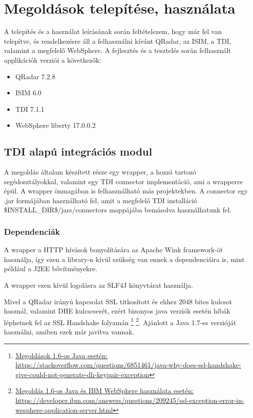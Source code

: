 \chapter{Megoldások telepítése, használata} \label{ch:usage}
A telepítés és a használat leírásának során feltételezem, hogy már fel van telepítve, és rendelkezésre áll a felhasználni kívánt QRadar, az ISIM, a TDI, valamint a megfelelő WebSphere. A fejlesztés és a tesztelés során felhasznált applikációk verziói a következők:

\begin{itemize}
	\item QRadar 7.2.8
	\item ISIM 6.0
	\item TDI 7.1.1
	\item WebSphere liberty 17.0.0.2
\end{itemize}



\section{TDI alapú integrációs modul}
A megoldás általam készített része egy wrapper, a hozzá tartozó segédosztályokkal, valamint egy TDI connector implementáció, ami a wrapperre épül. A wrapper önmagában is felhasználható más projektekben. A connector egy .jar formájában használható fel, amit a megfelelő TDI installáció \$INSTALL\_DIR\$/jars/connectors mappájába bemásolva használhatunk fel. 
\subsection{Dependenciák} \label{subsec:wrapdep}
A wrapper a HTTP hívások bonyolítására az Apache Wink\cite{wink} framework-öt használja, így ezen a library-n kívül szükség van ennek a dependenciáira is, mint például a J2EE bővítményekre.

A wrapper ezen kívül logolásra az SLF4J könyvtárat használja.\cite{slf4j}

Mivel a QRadar irányú kapcsolat SSL titkosított és ehhez 2048 bites kulcsot használ, valamint DHE kulcscserét, ezért bizonyos java verziók esetén hibák léphetnek fel az SSL Handshake folyamán
\footnote{\href{https://stackoverflow.com/questions/6851461/java-why-does-ssl-handshake-give-could-not-generate-dh-keypair-exception}{Megoldások 1.6-os Java esetén: https://stackoverflow.com/questions/6851461/java-why-does-ssl-handshake-give-could-not-generate-dh-keypair-exception}} \footnote{\href{https://developer.ibm.com/answers/questions/209245/ssl-exception-error-in-wesphere-application-server.html}{Megoldás 1.6-os Java és IBM WebSphere használata esetén: https://developer.ibm.com/answers/questions/209245/ssl-exception-error-in-wesphere-application-server.html}}.
Ajánlott a Java 1.7-es verzióját használni, amiben ezek már javítva vannak.
